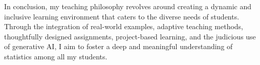 \documentclass{article}
\begin{document}
In conclusion, my teaching philosophy revolves around creating a dynamic and inclusive learning environment that caters to the diverse needs of students.
Through the integration of real-world examples, adaptive teaching methods, thoughtfully designed assignments, project-based learning, and the judicious use of generative AI, I aim to foster a deep and meaningful understanding of statistics among all my students.



\end{document}
